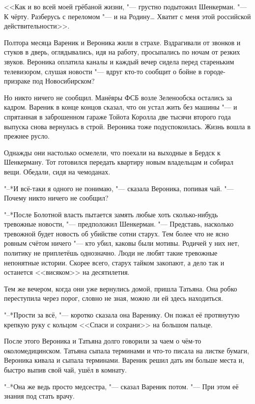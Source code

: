 <<Как и во всей моей грёбаной жизни, "--- грустно подытожил Шенкерман.
"--- К чёрту.
Разберусь с переломом "--- и на Родину\ldots{}
Хватит с меня этой российской действительности>>.

\asterism

Полтора месяца Вареник и Вероника жили в страхе.
Вздрагивали от звонков и стуков в дверь, оглядывались, идя на работу, просыпались по ночам от резких звуков.
Вероника оплатила каналы и каждый вечер сидела перед стареньким телевизором, слушая новости "--- вдруг кто-то сообщит о бойне в городе-призраке под Новосибирском?

Но никто ничего не сообщил.
Манёвры ФСБ возле Зеленообска остались за кадром.
Вареник в конце концов сказал, что он устал жить без машины "--- и спрятанная в заброшенном гараже Тойота Королла две тысячи второго года выпуска снова вернулась в строй.
Вероника тоже подуспокоилась.
Жизнь вошла в прежнее русло.

Однажды они настолько осмелели, что поехали на выходные в Бердск к Шенкерману.
Тот готовился передать квартиру новым владельцам и собирал вещи.
Обедали, сидя на чемоданах.

"--*И всё-таки я одного не понимаю, "--- сказала Вероника, попивая чай.
"--- Почему никто ничего не сообщил?

"--*После Болотной власть пытается замять любые хоть сколько-нибудь тревожные новости, "--- предположил Шенкерман.
"--- Представь, насколько тревожной будет новость об убийстве сотни старух.
Тем более что не ясно ровным счётом ничего "--- кто убил, каковы были мотивы.
Родичей у них нет, политику не приплетёшь однозначно.
Люди не любят такие тревожные непонятные истории.
Скорее всего, старух тайком закопают, а дело так и останется <<висяком>> на десятилетия.

Тем же вечером, когда они уже вернулись домой, пришла Татьяна.
Она робко переступила через порог, словно не зная, можно ли ей здесь находиться.

"--*Прости за всё, "--- коротко сказала она Варенику.
Он пожал её протянутую крепкую руку с кольцом <<Спаси и сохрани>> на большом пальце.

После этого Вероника и Татьяна долго говорили за чаем о чём-то околомедицинском.
Татьяна сыпала терминами и что-то писала на листке бумаги, Вероника кивала и сыпала терминами.
Вареник решил дать им больше места и, быстро выпив свой чай, ушёл в комнату.

"--*Она же ведь просто медсестра, "--- сказал Вареник потом.
"--- При этом её знания под стать врачу.

